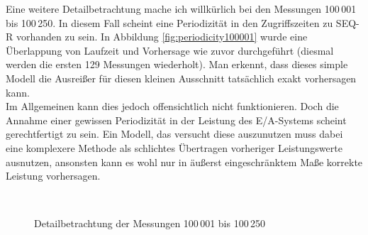 \documentclass[
	12pt,
	a4paper,
	BCOR10mm,
	DIV14,
	listof=totoc,
	bibliography=totoc,
	headsepline
]{scrreprt}
\begin{document}
Eine weitere Detailbetrachtung mache ich willkürlich bei den Messungen 100\,001 bis 100\,250.
In diesem Fall scheint eine Periodizität in den Zugriffszeiten zu SEQ-R vorhanden zu sein. In Abbildung \ref{fig:periodicity100001} wurde eine Überlappung von Laufzeit und Vorhersage wie zuvor durchgeführt (diesmal werden die ersten 129 Messungen wiederholt). Man erkennt, dass dieses simple Modell die Ausreißer für diesen kleinen Ausschnitt tatsächlich exakt vorhersagen kann.\\
Im Allgemeinen kann dies jedoch offensichtlich nicht funktionieren.
Doch die Annahme einer gewissen Periodizität in der Leistung des E/A-Systems scheint gerechtfertigt zu sein.
Ein Modell, das versucht diese auszunutzen muss dabei eine komplexere Methode als schlichtes Übertragen vorheriger Leistungswerte ausnutzen, ansonsten kann es wohl nur in äußerst eingeschränktem Maße korrekte Leistung vorhersagen.

\begin{figure}
	\centering
	\hfill
	\\
	\hfill
	\caption{Detailbetrachtung der Messungen 100\,001 bis 100\,250}
	\label{fig:from100001}
\end{figure} 
\end{document}
